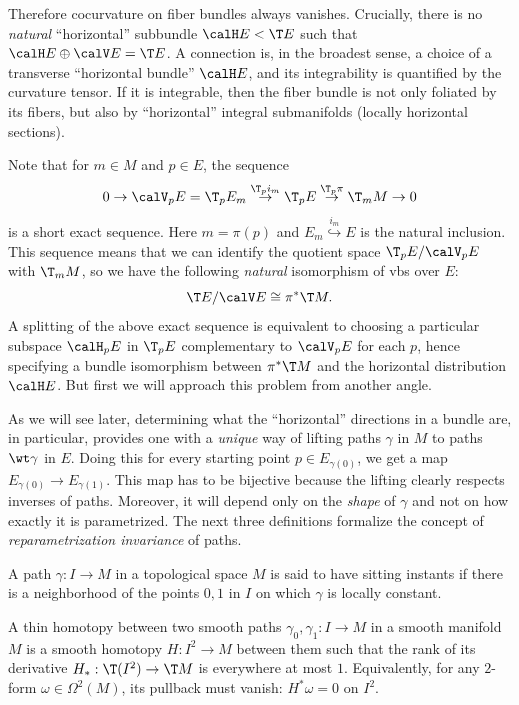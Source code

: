 Therefore cocurvature on fiber bundles always vanishes. Crucially, there is no \emph{natural} ``horizontal'' subbundle $\calH E<\T E$ such that $\calH E\oplus \calV E=\T E$. A connection is, in the broadest sense, a choice of a transverse ``horizontal bundle'' $\calH E$, and its integrability is quantified by the curvature tensor. If it is integrable, then the fiber bundle is not only foliated by its fibers, but also by ``horizontal''  integral submanifolds (locally horizontal sections).

Note that for $m\in M$ and $p\in E$, the sequence
\[0\to \calV_p E=\T_p E_m\overset{\T_p i_m}{\to}\T_p E\overset{\T_p\pi}{\to}\T_mM\to 0\]
is a short exact sequence. Here $m=\pi(p)$ and $E_m\overset{i_m}{\hookrightarrow} E$ is the natural inclusion. This sequence means that we can identify the quotient space $\T_pE\slash \calV_pE$ with $\T_mM$, so we have the following \emph{natural} isomorphism of \glspl{vb} over $E$:
\[\T E\slash \calV E\cong \pi^\ast \T M.\]
A splitting of the above exact sequence is equivalent to choosing a particular subspace $\calH_p E$ in $\T_p E$ complementary to $\calV_p E$ for each $p$, hence specifying a bundle isomorphism between $\pi^\ast \T M$ and the horizontal distribution $\calH E$. But first we will approach this problem from another angle.

As we will see later, determining what the ``horizontal'' directions in a bundle are, in particular, provides one with a \emph{unique} way of lifting paths $\gamma$ in $M$ to paths $\wt\gamma$ in $E$. Doing this for every starting point $p\in E_{\gamma(0)}$, we get a map $E_{\gamma(0)}\to E_{\gamma(1)}$. This map has to be bijective because the lifting clearly respects inverses of paths. Moreover, it will depend only on the \emph{shape} of $\gamma$ and not on how exactly it is parametrized. The next three definitions formalize the concept of \emph{reparametrization invariance} of paths.

\begin{defn}
    A path $\gamma:I\to M$ in a topological space $M$ is said to have sitting instants if there is a neighborhood of the points $0,1$ in $I$ on which $\gamma$ is locally constant.
\end{defn}

\begin{defn}
    A thin homotopy between two smooth paths $\gamma_0,\gamma_1:I\to M$ in a smooth manifold $M$ is a smooth homotopy $H:I^2\to M$ between them such that the rank of its derivative $H_\ast:\T(I^2)\to \T M$ is everywhere at most $1$. Equivalently, for any $2$-form $\omega\in\Omega^2(M)$, its pullback must vanish: $H^\ast \omega=0$ on $I^2$.
\end{defn}

